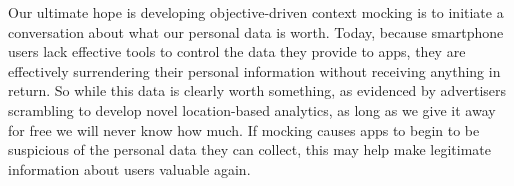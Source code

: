 Our ultimate hope is developing objective-driven context mocking is to
initiate a conversation about what our personal data is worth. Today, because
smartphone users lack effective tools to control the data they provide to
apps, they are effectively surrendering their personal information without
receiving anything in return. So while this data is clearly worth something,
as evidenced by advertisers scrambling to develop novel location-based
analytics, as long as we give it away for free we will never know how much.
If mocking causes apps to begin to be suspicious of the personal data they
can collect, this may help make legitimate information about users valuable
again.
